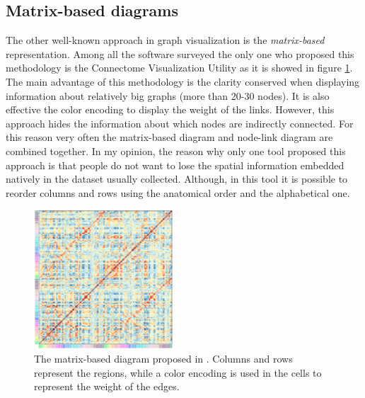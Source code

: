 \documentclass{article}
\begin{document}
\begin{multicols}{2}
\subsection{Matrix-based diagrams}
\label{subsec:matrixbased}
The other well-known approach in graph visualization is the \textit{matrix-based} representation. Among all the software surveyed the only one who proposed this methodology is the Connectome Visualization Utility as it is showed in figure \ref{fig:matrix}. The main advantage of this methodology is the clarity conserved when displaying information about relatively big graphs (more than 20-30 nodes). It is also effective the color encoding to display the weight of the links. However, this approach hides the information about which nodes are indirectly connected. For this reason very often the matrix-based diagram and node-link diagram are combined together. In my opinion, the reason why only one tool proposed this approach is that people do not want to lose the spatial information embedded natively in the dataset usually collected. Although, in this tool it is possible to reorder columns and rows using the anatomical order and the alphabetical one. 
\begin{figure}[H]
\centering
\includegraphics[width = 0.9\columnwidth]{matrix}
\caption{The matrix-based diagram proposed in \cite{connectomeVisualizationUtility}. Columns and rows represent the regions, while a color encoding is used in the cells to represent the weight of the edges.}
\label{fig:matrix}
\end{figure}






\end{multicols}
\end{document}
